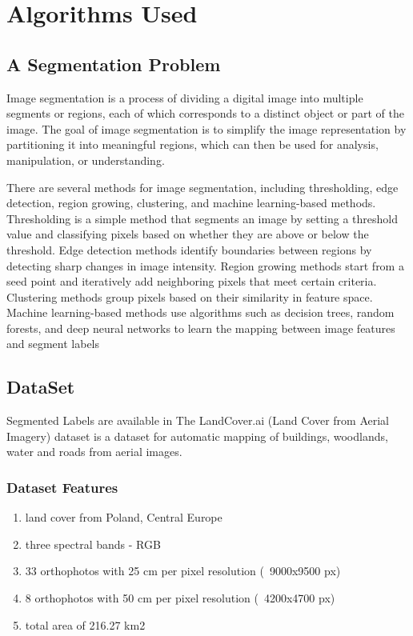 \chapter{Algorithms Used}

\section{A Segmentation Problem}
Image segmentation is a process of dividing a digital image into multiple segments or regions, each of which corresponds to a distinct object or part of the image. The goal of image segmentation is to simplify the image representation by partitioning it into meaningful regions, which can then be used for analysis, manipulation, or understanding.

There are several methods for image segmentation, including thresholding, edge detection, region growing, clustering, and machine learning-based methods. Thresholding is a simple method that segments an image by setting a threshold value and classifying pixels based on whether they are above or below the threshold. Edge detection methods identify boundaries between regions by detecting sharp changes in image intensity. Region growing methods start from a seed point and iteratively add neighboring pixels that meet certain criteria. Clustering methods group pixels based on their similarity in feature space. Machine learning-based methods use algorithms such as decision trees, random forests, and deep neural networks to learn the mapping between image features and segment labels

\section{DataSet}
Segmented Labels are available in \cite{five}
The LandCover.ai (Land Cover from Aerial Imagery) dataset is a dataset for automatic mapping of buildings, woodlands, water and roads from aerial images.
\subsection{Dataset Features}
\begin{enumerate}
    \item land cover from Poland, Central Europe 
    \item three spectral bands - RGB
    \item 33 orthophotos with 25 cm per pixel resolution (~9000x9500 px)
    \item 8 orthophotos with 50 cm per pixel resolution (~4200x4700 px)
    \item total area of 216.27 km2
\end{enumerate}
